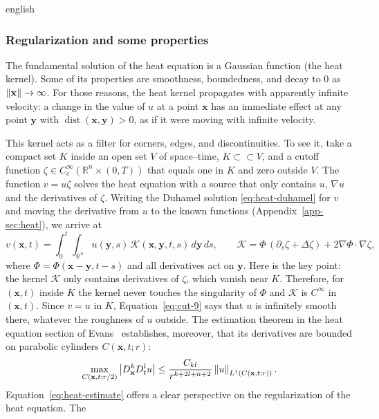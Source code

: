 \begin{hyphenrules}{english}
\subsubsection{Regularization and some properties}
The fundamental solution of the heat equation is a Gaussian function (the heat kernel). Some of its
properties are smoothness, boundedness, and decay to $0$ as $\left\lVert \mathbf{x} \right\rVert\to\infty$. For those reasons,
the heat kernel propagates with apparently infinite velocity: a change in the value of $u$ at a point
$\mathbf{x}$ has an immediate effect at any point $\mathbf{y}$ with $\operatorname{dist}(\mathbf{x},\mathbf{y})>0$, as if it were
moving with infinite velocity.

This kernel acts as a filter for corners, edges, and discontinuities. To see it, take a compact set $K$
inside an open set $V$ of space--time, $K\subset\subset V$, and a cutoff function
$\zeta\in C_c^\infty(\mathbb{R}^n\times(0,T))$ that equals one in $K$ and zero outside $V$. The function
$v=u\zeta$ solves the heat equation with a source that only contains $u$, $\nabla u$ and the derivatives
of $\zeta$. Writing the Duhamel solution \eqref{eq:heat-duhamel} for $v$ and moving the derivative from $u$
to the known functions (Appendix~\ref{app-sec:heat}), we arrive at
\begin{equation}
  v(\mathbf{x},t)=\int_0^t\!\!\int_{\mathbb{R}^n}u(\mathbf{y},s)\,\mathcal{K}(\mathbf{x},\mathbf{y},t,s)\,d\mathbf{y}\,d s,
  \qquad\mathcal{K}=\Phi\,(\partial_s\zeta+\Delta\zeta)+2\nabla\Phi\cdot\nabla\zeta,
  \label{eq:cut-9}
\end{equation}
where $\Phi=\Phi(\mathbf{x}-\mathbf{y},t-s)$ and all derivatives act on $\mathbf{y}$. Here is the key point: the kernel $\mathcal{K}$ only contains derivatives of $\zeta$, which vanish
near $K$. Therefore, for $(\mathbf{x},t)$ inside $K$ the kernel never touches the singularity of $\Phi$ and
$\mathcal{K}$ is $C^\infty$ in $(\mathbf{x},t)$. Since $v=u$ in $K$, Equation~\eqref{eq:cut-9} says that $u$ is
infinitely smooth there, whatever the roughness of $u$ outside. The estimation theorem in the heat
equation section of Evans~\cite{evans2010} establishes, moreover, that its derivatives are bounded on
parabolic cylinders $C(\mathbf{x},t;r)$:
\begin{equation}
  \max_{C(\mathbf{x},t;r/2)}\left\lvert D_{\mathbf{x}}^{k}D_t^{l}u \right\rvert\le\frac{C_{kl}}{r^{k+2l+n+2}}\left\lVert u \right\rVert_{L^1(C(\mathbf{x},t;r))}.
  \label{eq:heat-estimate}
\end{equation}
Equation~\eqref{eq:heat-estimate} offers a clear perspective on the regularization of the heat equation. The

\end{hyphenrules}
